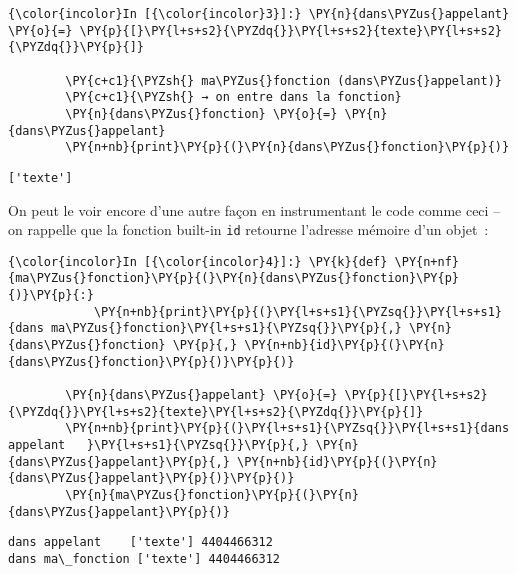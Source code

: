     \begin{Verbatim}[commandchars=\\\{\}]
{\color{incolor}In [{\color{incolor}3}]:} \PY{n}{dans\PYZus{}appelant} \PY{o}{=} \PY{p}{[}\PY{l+s+s2}{\PYZdq{}}\PY{l+s+s2}{texte}\PY{l+s+s2}{\PYZdq{}}\PY{p}{]}
        
        \PY{c+c1}{\PYZsh{} ma\PYZus{}fonction (dans\PYZus{}appelant)}
        \PY{c+c1}{\PYZsh{} → on entre dans la fonction}
        \PY{n}{dans\PYZus{}fonction} \PY{o}{=} \PY{n}{dans\PYZus{}appelant}
        \PY{n+nb}{print}\PY{p}{(}\PY{n}{dans\PYZus{}fonction}\PY{p}{)}
\end{Verbatim}


    \begin{Verbatim}[commandchars=\\\{\}]
['texte']

    \end{Verbatim}

    On peut le voir encore d'une autre façon en instrumentant le code comme
ceci -- on rappelle que la fonction built-in \texttt{id} retourne
l'adresse mémoire d'un objet~:

    \begin{Verbatim}[commandchars=\\\{\}]
{\color{incolor}In [{\color{incolor}4}]:} \PY{k}{def} \PY{n+nf}{ma\PYZus{}fonction}\PY{p}{(}\PY{n}{dans\PYZus{}fonction}\PY{p}{)}\PY{p}{:}
            \PY{n+nb}{print}\PY{p}{(}\PY{l+s+s1}{\PYZsq{}}\PY{l+s+s1}{dans ma\PYZus{}fonction}\PY{l+s+s1}{\PYZsq{}}\PY{p}{,} \PY{n}{dans\PYZus{}fonction} \PY{p}{,} \PY{n+nb}{id}\PY{p}{(}\PY{n}{dans\PYZus{}fonction}\PY{p}{)}\PY{p}{)}
            
        \PY{n}{dans\PYZus{}appelant} \PY{o}{=} \PY{p}{[}\PY{l+s+s2}{\PYZdq{}}\PY{l+s+s2}{texte}\PY{l+s+s2}{\PYZdq{}}\PY{p}{]}
        \PY{n+nb}{print}\PY{p}{(}\PY{l+s+s1}{\PYZsq{}}\PY{l+s+s1}{dans appelant   }\PY{l+s+s1}{\PYZsq{}}\PY{p}{,} \PY{n}{dans\PYZus{}appelant}\PY{p}{,} \PY{n+nb}{id}\PY{p}{(}\PY{n}{dans\PYZus{}appelant}\PY{p}{)}\PY{p}{)}
        \PY{n}{ma\PYZus{}fonction}\PY{p}{(}\PY{n}{dans\PYZus{}appelant}\PY{p}{)}
\end{Verbatim}


    \begin{Verbatim}[commandchars=\\\{\}]
dans appelant    ['texte'] 4404466312
dans ma\_fonction ['texte'] 4404466312

    \end{Verbatim}

